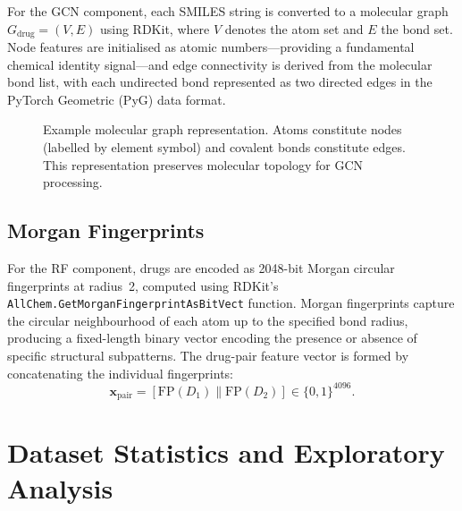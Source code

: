 \documentclass[12pt,a4paper,oneside]{report}
\begin{document}
For the GCN component, each SMILES string is converted to a molecular graph $G_{\text{drug}}
= (V, E)$ using RDKit, where $V$ denotes the atom set and $E$ the bond set. Node features
are initialised as atomic numbers---providing a fundamental chemical identity signal---and
edge connectivity is derived from the molecular bond list, with each undirected bond
represented as two directed edges in the PyTorch Geometric (PyG) data format.

\begin{figure}[htbp]
\centering
{}
\caption{Example molecular graph representation. Atoms constitute nodes (labelled by
element symbol) and covalent bonds constitute edges. This representation preserves
molecular topology for GCN processing.}
\label{fig:mol_graph}
\end{figure}

\subsection{Morgan Fingerprints}

For the RF component, drugs are encoded as 2048-bit Morgan circular fingerprints at
radius~2, computed using RDKit's \texttt{AllChem.GetMorganFingerprintAsBitVect} function.
Morgan fingerprints capture the circular neighbourhood of each atom up to the specified
bond radius, producing a fixed-length binary vector encoding the presence or absence of
specific structural subpatterns. The drug-pair feature vector is formed by concatenating
the individual fingerprints:
\begin{equation}
  \mathbf{x}_{\text{pair}} = [\mathrm{FP}(D_1) \| \mathrm{FP}(D_2)] \in \{0,1\}^{4096}.
  \label{eq:fp_concat}
\end{equation}

\section{Dataset Statistics and Exploratory Analysis}
\end{document}
